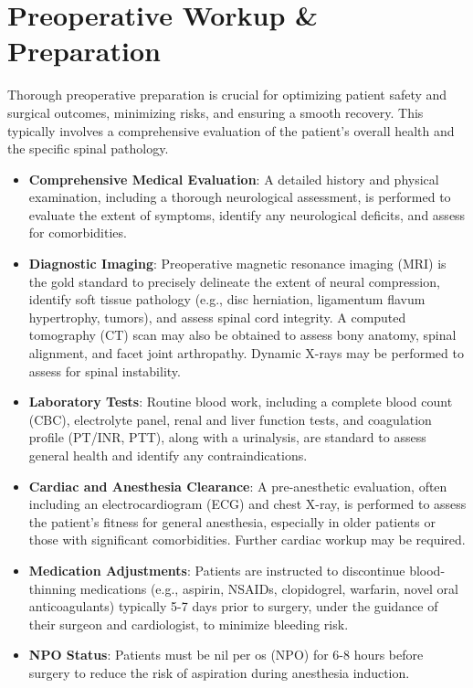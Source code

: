 \section*{Preoperative Workup \& Preparation}
Thorough preoperative preparation is crucial for optimizing patient safety and surgical outcomes, minimizing risks, and ensuring a smooth recovery. This typically involves a comprehensive evaluation of the patient's overall health and the specific spinal pathology.

\begin{itemize}
  \item \textbf{Comprehensive Medical Evaluation}: A detailed history and physical examination, including a thorough neurological assessment, is performed to evaluate the extent of symptoms, identify any neurological deficits, and assess for comorbidities.
  \item \textbf{Diagnostic Imaging}: Preoperative magnetic resonance imaging (MRI) is the gold standard to precisely delineate the extent of neural compression, identify soft tissue pathology (e.g., disc herniation, ligamentum flavum hypertrophy, tumors), and assess spinal cord integrity. A computed tomography (CT) scan may also be obtained to assess bony anatomy, spinal alignment, and facet joint arthropathy. Dynamic X-rays may be performed to assess for spinal instability.
  \item \textbf{Laboratory Tests}: Routine blood work, including a complete blood count (CBC), electrolyte panel, renal and liver function tests, and coagulation profile (PT/INR, PTT), along with a urinalysis, are standard to assess general health and identify any contraindications.
  \item \textbf{Cardiac and Anesthesia Clearance}: A pre-anesthetic evaluation, often including an electrocardiogram (ECG) and chest X-ray, is performed to assess the patient's fitness for general anesthesia, especially in older patients or those with significant comorbidities. Further cardiac workup may be required.
  \item \textbf{Medication Adjustments}: Patients are instructed to discontinue blood-thinning medications (e.g., aspirin, NSAIDs, clopidogrel, warfarin, novel oral anticoagulants) typically 5-7 days prior to surgery, under the guidance of their surgeon and cardiologist, to minimize bleeding risk.
  \item \textbf{NPO Status}: Patients must be nil per os (NPO) for 6-8 hours before surgery to reduce the risk of aspiration during anesthesia induction.

\end{itemize}

